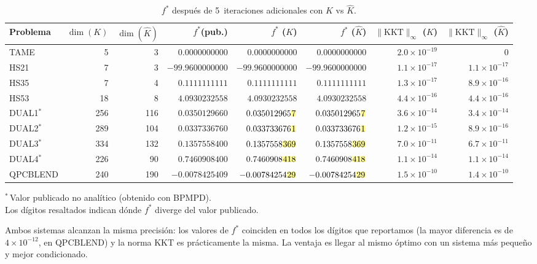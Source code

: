 \begin{table}[H]
\centering
\caption{$f^*$ después de 5~iteraciones adicionales con $K$ vs $\widehat{K}$.}
\label{tab:f_K_vs_Khat}
\scriptsize
\setlength{\tabcolsep}{4pt}
\begin{tabular}{l r r r r r r r}
\toprule
Problema & $\dim(K)$ & $\dim(\widehat{K})$ & $f^*$(pub.) & $f^*$ ($K$) & $f^*$ ($\widehat{K}$) & $\|\text{KKT}\|_\infty$ ($K$) & $\|\text{KKT}\|_\infty$ ($\widehat{K}$) \\
\midrule
TAME      &   5 &   3 & $0.0000000000$ & $0.0000000000$ & $0.0000000000$ & $2.0\times10^{-19}$ & $0$ \\
HS21      &   7 &   3 & $-99.9600000000$ & $-99.9600000000$ & $-99.9600000000$ & $1.1\times10^{-17}$ & $1.1\times10^{-17}$ \\
HS35      &   7 &   4 & $0.1111111111$ & $0.1111111111$ & $0.1111111111$ & $1.3\times10^{-17}$ & $8.9\times10^{-16}$ \\
HS53      &  18 &   8 & $4.0930232558$ & $4.0930232558$ & $4.0930232558$ & $4.4\times10^{-16}$ & $4.4\times10^{-16}$ \\
DUAL1$^*$ & 256 & 116 & $0.0350129660$ & $0.035012965\hldig{7}$ & $0.035012965\hldig{7}$ & $3.6\times10^{-14}$ & $3.4\times10^{-14}$ \\
DUAL2$^*$ & 289 & 104 & $0.0337336760$ & $0.033733676\hldig{1}$ & $0.033733676\hldig{1}$ & $1.2\times10^{-15}$ & $8.9\times10^{-16}$ \\
DUAL3$^*$ & 334 & 132 & $0.1357558400$ & $0.1357558\hldig{369}$ & $0.1357558\hldig{369}$ & $7.0\times10^{-11}$ & $6.7\times10^{-11}$ \\
DUAL4$^*$ & 226 &  90 & $0.7460908400$ & $0.7460908\hldig{418}$ & $0.7460908\hldig{418}$ & $1.1\times10^{-14}$ & $1.1\times10^{-14}$ \\
QPCBLEND  & 240 & 190 & $-0.0078425409$ & $-0.00784254\hldig{29}$ & $-0.00784254\hldig{29}$ & $1.5\times10^{-10}$ & $1.4\times10^{-10}$ \\
\bottomrule
\end{tabular}

\vspace{0.3em}
\footnotesize
$^*$\,Valor publicado no analítico (obtenido con BPMPD).\\
Los dígitos resaltados indican dónde $f^*$ diverge del valor publicado.
\end{table}

Ambos sistemas alcanzan la misma precisión: los valores de $f^*$ coinciden en todos los dígitos que reportamos (la mayor diferencia es de $4\times10^{-12}$, en QPCBLEND) y la norma KKT es prácticamente la misma. La ventaja es llegar al mismo óptimo con un sistema más pequeño y mejor condicionado.

